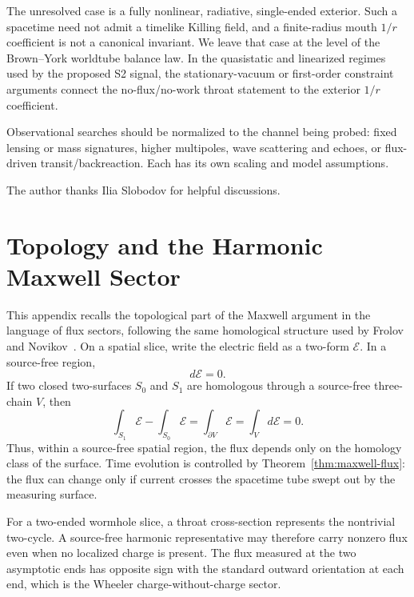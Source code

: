 \documentclass[aps,prd,10pt,onecolumn,nofootinbib,superscriptaddress,floatfix]{revtex4-2}
\begin{document}
The unresolved case is a fully nonlinear, radiative, single-ended exterior.
Such a spacetime need not admit a timelike Killing field, and a finite-radius
mouth $1/r$ coefficient is not a canonical invariant.  We leave that case at
the level of the Brown--York worldtube balance law.  In the
quasistatic and linearized regimes used by the proposed S2 signal, the
stationary-vacuum or first-order constraint arguments connect the
no-flux/no-work throat statement to the exterior $1/r$ coefficient.

Observational searches should be normalized to the channel being probed:
fixed lensing or mass signatures, higher multipoles, wave scattering and
echoes, or flux-driven transit/backreaction.  Each has its own scaling and
model assumptions.

\begin{acknowledgments}
The author thanks Ilia Slobodov for helpful discussions.
\end{acknowledgments}

\appendix

\section{Topology and the Harmonic Maxwell Sector}
\label{app:cohomology}

This appendix recalls the topological part of the Maxwell argument in the
language of flux sectors, following the same homological structure used by
Frolov and Novikov~\cite{FrolovNovikov1990PhysicalEffects}.  On a spatial
slice, write the electric field as a two-form $\mathcal E$.  In a source-free
region,
\begin{equation}
  d\mathcal E=0 .
\end{equation}
If two closed two-surfaces $S_0$ and $S_1$ are homologous through a source-free
three-chain $V$, then
\begin{equation}
  \int_{S_1}\mathcal E-\int_{S_0}\mathcal E
  =
  \int_{\partial V}\mathcal E
  =
  \int_V d\mathcal E
  =
  0 .
\end{equation}
Thus, within a source-free spatial region, the flux depends only on the
homology class of the surface.  Time evolution is controlled by
Theorem~\ref{thm:maxwell-flux}: the flux can change only if current
crosses the spacetime tube swept out by the measuring surface.

For a two-ended wormhole slice, a throat cross-section represents the
nontrivial two-cycle.  A source-free harmonic representative may therefore
carry nonzero flux even when no localized charge is present.  The flux measured
at the two asymptotic ends has opposite sign with the standard outward
orientation at each end, which is the Wheeler charge-without-charge sector.
\end{document}
